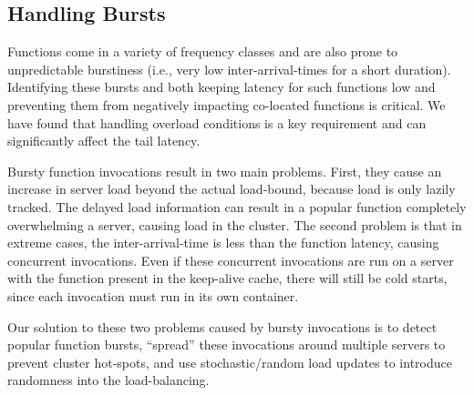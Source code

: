 
\subsection{Handling Bursts}
\label{subsec:bursty}

Functions come in a variety of frequency classes and are also prone to unpredictable burstiness (i.e., very low inter-arrival-times for a short duration). 
Identifying these bursts and both keeping latency for such  functions low and preventing them from negatively impacting co-located functions is critical.
We have found that handling overload conditions is a key requirement and can significantly affect the tail latency.

Bursty function invocations result in two main problems.
First, they cause an increase in server load beyond the actual load-bound, because load is only lazily tracked.
The delayed load information can result in a popular function completely overwhelming a server, causing load  in the cluster.
The second problem is that in extreme cases, the inter-arrival-time is less than the function latency, causing concurrent invocations.
Even if these concurrent invocations are run on a  server with the function present in the keep-alive cache, there will still be cold starts, since each invocation must run in its own container. 

Our solution to these two problems caused by bursty invocations is to detect popular function bursts, ``spread'' these invocations around multiple servers to prevent cluster hot-spots, and use stochastic/random load updates to introduce randomness into the load-balancing. 

\begin{comment}
Multiple problems. 1. Increase the load beyond the bound because lazily tracked. 2. Concurrent: no warm starts. Spreading them around will be useful. 

The problem of concurrent invocations is vexing even with locality, since containers may be in use and thus results in cold starts for these invocations. In the worst case we must accept $n-1$ cold starts for an $n$ core server. 

We use two strategies:
1. Identify popular functions in a low-overhead online manner.
1a. Use this information to inform the load estimate. Due to the problem of \textbf{stale loads.}
2. Extreme overload: pick least loaded server if going around the horn.  %

This is similar to epsilon-greedy: we greedily pick the server based on the expected running time estimate for unpopular functions and probabilistically for popular functions. 
The probability is determined based on the server load and the noise in the server load estimate, which in turn depends on the estimate of the recent arrival rate of the functions. 

\end{comment}

